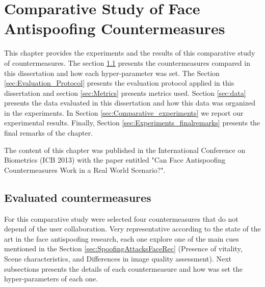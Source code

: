 \chapter{Comparative Study of Face Antispoofing Countermeasures}
\label{chap:Comparative_Study}

This chapter provides the experiments and the results of this comparative study of countermeasures. The section \ref{sec:Evaluated_countermeasures} presents the countermeasures compared in this dissertation and how each hyper-parameter was set. The Section \ref{sec:Evaluation_Protocol} presents the evaluation protocol applied in this dissertation and section \ref{sec:Metrics} presents metrics used. Section \ref{sec:data} presents the data evaluated in this dissertation and how this data was organized in the experiments. In Section \ref{sec:Comparative_experiments} we report our experimental results. Finally, Section \ref{sec:Experiments_finalremarks} presents the final remarks of the chapter.

The content of this chapter was published in the International Conference on Biometrics (ICB 2013) with the paper entitled "Can Face Antispoofing Countermeasures Work in a Real World Scenario?".




\section{Evaluated countermeasures}
\label{sec:Evaluated_countermeasures}

For this comparative study were selected four countermeasures that do not depend of the user collaboration. Very representative according to the state of the art in the face antispoofing research, each one explore one of the main cues mentioned in the Section \ref{sec:SpoofingAttacksFaceRec} (Presence of vitality, Scene characteristics, and Differences in image quality assessment). Next subsections presents the details of each countermeasure and how was set the hyper-parameters of each one.

